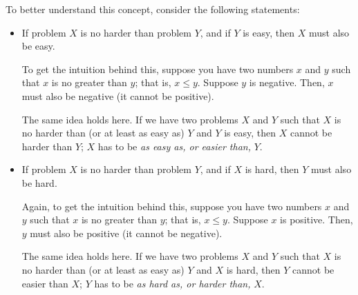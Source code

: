 \documentclass[letterpaper]{article}
\begin{document}
To better understand this concept, consider the following statements:
\begin{itemize}
    \item If problem $X$ is no harder than problem $Y$, and if $Y$ is easy, then $X$ must also be easy. 
    \begin{mdframed}[]
        To get the intuition behind this, suppose you have two numbers $x$ and $y$ such that $x$ is no greater than $y$; that is, $x \leq y$. Suppose $y$ is negative. Then, $x$ must also be negative (it cannot be positive). 

        \bigskip 

        The same idea holds here. If we have two problems $X$ and $Y$ such that $X$ is no harder than (or at least as easy as) $Y$ and $Y$ is easy, then $X$ cannot be harder than $Y$; $X$ has to be \emph{as easy as, or easier than,} $Y$. 
    \end{mdframed}
    \item If problem $X$ is no harder than problem $Y$, and if $X$ is hard, then $Y$ must also be hard. 
    \begin{mdframed}[]
        Again, to get the intuition behind this, suppose you have two numbers $x$ and $y$ such that $x$ is no greater than $y$; that is, $x \leq y$. Suppose $x$ is positive. Then, $y$ must also be positive (it cannot be negative). 

        \bigskip 

        The same idea holds here. If we have two problems $X$ and $Y$ such that $X$ is no harder than (or at least as easy as) $Y$ and $X$ is hard, then $Y$ cannot be easier than $X$; $Y$ has to be \emph{as hard as, or harder than,} $X$. 
    \end{mdframed}
\end{itemize}
\end{document}
